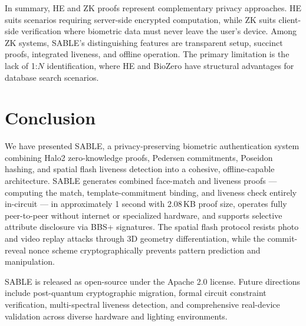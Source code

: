 \documentclass[conference]{IEEEtran}
\begin{document}
In summary, HE and ZK proofs represent complementary privacy approaches. HE suits scenarios requiring server-side encrypted computation, while ZK suits client-side verification where biometric data must never leave the user's device. Among ZK systems, SABLE's distinguishing features are transparent setup, succinct proofs, integrated liveness, and offline operation. The primary limitation is the lack of 1:$N$ identification, where HE and BioZero have structural advantages for database search scenarios.

\section{Conclusion}
\label{sec:conclusion}

We have presented SABLE, a privacy-preserving biometric authentication system combining Halo2 zero-knowledge proofs, Pedersen commitments, Poseidon hashing, and spatial flash liveness detection into a cohesive, offline-capable architecture. SABLE generates combined face-match and liveness proofs --- computing the match, template-commitment binding, and liveness check entirely in-circuit --- in approximately 1 second with 2.08\,KB proof size, operates fully peer-to-peer without internet or specialized hardware, and supports selective attribute disclosure via BBS+ signatures. The spatial flash protocol resists photo and video replay attacks through 3D geometry differentiation, while the commit-reveal nonce scheme cryptographically prevents pattern prediction and manipulation.

SABLE is released as open-source under the Apache 2.0 license. Future directions include post-quantum cryptographic migration, formal circuit constraint verification, multi-spectral liveness detection, and comprehensive real-device validation across diverse hardware and lighting environments.


\end{document}
